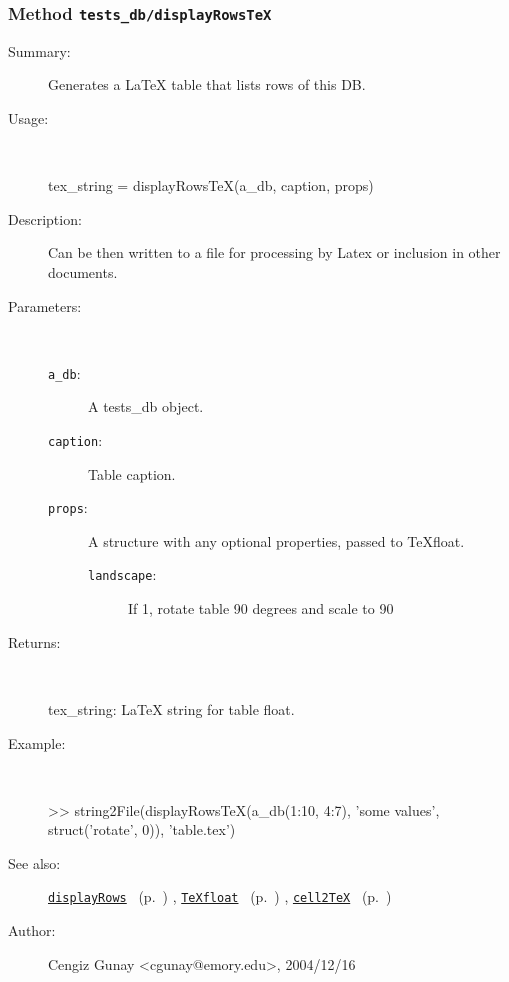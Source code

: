 \subsubsection[Method \texttt{displayRowsTeX}]{Method \texttt{tests\_db/displayRowsTeX}}%
%
\label{ref_tests_db__displayRowsTeX}%
\hypertarget{ref_tests_db__displayRowsTeX}{}%
\begin{description}
\item[Summary:]Generates a LaTeX table that lists rows of this DB.
%
\item[Usage:]~%
\begin{lyxcode}%
tex\_string = displayRowsTeX(a\_db, caption, props)
%
\end{lyxcode}%
%
\item[Description:]%
Can be then written to a file for processing by Latex or inclusion in
 other documents.
\item[Parameters:]~
\begin{description}%
\item[\texttt{a\_db}:]
 A tests\_db object.
\item[\texttt{caption}:]
 Table caption.
\item[\texttt{props}:]
 A structure with any optional properties, passed to TeXfloat.
\begin{description}%
\item[\texttt{landscape}:]
 If 1, rotate table 90 degrees and scale to 90%
\end{description}%
\end{description}%
%
\item[Returns:
]~

   tex\_string: LaTeX string for table float.
%
\item[Example:]~
\begin{lyxcode} >> string2File(displayRowsTeX(a\_db(1:10, 4:7), 'some values',
\\%
                               struct('rotate', 0)), 'table.tex')
\\%
\end{lyxcode}
%
\item[See also:]%
\hyperlink{ref_displayRows}{\texttt{displayRows}}%
\ (p.~\pageref{ref_displayRows})%
%
, \hyperlink{ref_TeXfloat}{\texttt{TeXfloat}}%
\ (p.~\pageref{ref_TeXfloat})%
%
, \hyperlink{ref_cell2TeX}{\texttt{cell2TeX}}%
\ (p.~\pageref{ref_cell2TeX})%
%
%
\item[Author:]%
Cengiz Gunay <cgunay@emory.edu>, 2004/12/16
%
\end{description}
\methodline%
